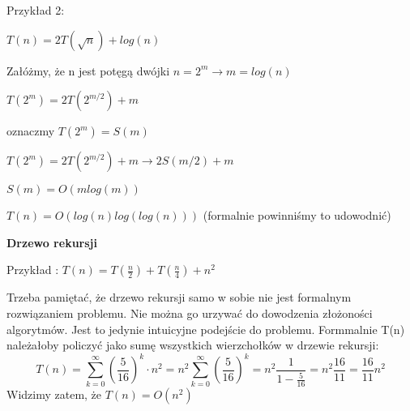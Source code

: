 \documentclass{article}
\begin{document}
Przykład 2: \par
\vspace{1\baselineskip}
$T(n) = 2T(\sqrt{n}) + log(n)$ \par
Załóżmy, że n jest potęgą dwójki $n = 2^m \rightarrow m = log(n)$ \par
$T(2^m) = 2T(2^{m/2}) + m$ \par
oznaczmy $T(2^m) = S(m)$ \par
$T(2^m) = 2T(2^{m/2}) + m \rightarrow 2S(m/2) + m$ \par
$S(m) = O(m log(m))$ \par
$T(n) = O(log(n) log(log(n)))$ (formalnie powinniśmy to udowodnić) \par  
\vspace{1\baselineskip}
\textbf{Drzewo rekursji} \par
\vspace{1\baselineskip}
Przykład : $T(n) = T(\frac{n}{2}) +T (\frac{n}{4}) + n^2$ \par
\vspace{1\baselineskip}
\begin{center}
\end{center}
\vspace{1\baselineskip}
Trzeba pamiętać, że drzewo rekursji samo w sobie nie jest formalnym rozwiązaniem problemu. Nie można go urzywać do dowodzenia złożoności algorytmów.
Jest to jedynie intuicyjne podejście do problemu. Formmalnie T(n) należałoby policzyć jako sumę wszystkich wierzchołków w drzewie rekursji:
\[
    T(n) = \sum^{\infty}_{k=0} \left(\frac{5}{16}\right)^k \cdot n^2 = n^2 \sum^{\infty}_{k=0} \left(\frac{5}{16}\right)^k = n^2 \frac{1}{1-\frac{5}{16}} = n^2 \frac{16}{11} = \frac{16}{11}n^2
\]
Widzimy zatem, że $T(n) = O(n^2)$ \par
\vspace{1\baselineskip}
\end{document}
